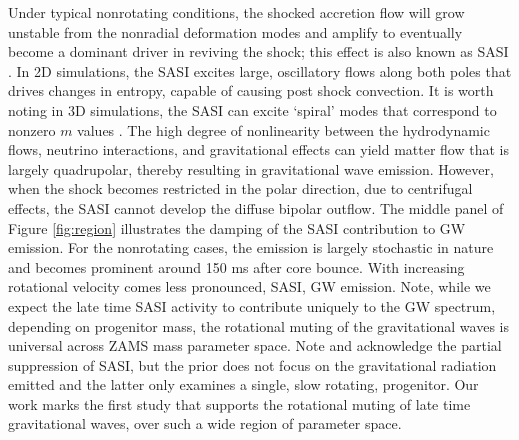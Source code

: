 \documentclass[twocolumn,times]{aastex62}  %
\begin{document}
Under typical nonrotating conditions, the shocked accretion flow will grow unstable from the nonradial deformation modes and amplify to eventually become a dominant driver in reviving the shock; this effect is also known as SASI \citep{scheck:2008,marek:2009a}.  In 2D simulations, the SASI excites large, oscillatory flows along both poles that drives changes in entropy, capable of causing post shock convection.  It is worth noting in 3D simulations, the SASI can excite `spiral' modes that correspond to nonzero $m$ values \citep{kuroda:2016}.  The high degree of nonlinearity between the hydrodynamic flows, neutrino interactions, and gravitational effects can yield matter flow that is largely quadrupolar, thereby resulting in gravitational wave emission.  However, when the shock becomes restricted in the polar direction, due to centrifugal effects, the SASI cannot develop the diffuse bipolar outflow. The middle panel of Figure \ref{fig:region} illustrates the damping of the SASI contribution to GW emission.  For the nonrotating cases, the emission is largely stochastic in nature and becomes prominent around 150 ms after core bounce.  With increasing rotational velocity comes less pronounced, SASI, GW emission.  Note, while we expect the late time SASI activity to contribute uniquely to the GW spectrum, depending on progenitor mass, the rotational muting of the gravitational waves is universal across ZAMS mass parameter space.  Note \citet{burrows:2007}  and \citet{moro:2018} acknowledge the partial suppression of SASI, but the prior does not focus on the gravitational radiation emitted and the latter only examines a single, slow rotating, progenitor.  Our work marks the first study that supports the rotational muting of late time gravitational waves, over such a wide region of parameter space. 
 
\end{document}
